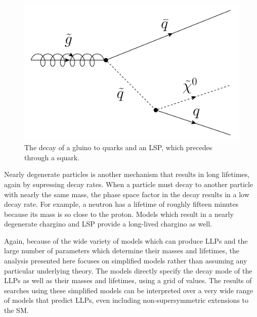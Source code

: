 \begin{figure}
\includegraphics[width=\fullfig]{figures/gluino_decay.png}
\caption{The decay of a gluino to quarks and an \ac{LSP}, which precedes through a squark.}
\label{fig:gluino_decay}
\end{figure}

Nearly degenerate particles is another mechanism that results in long lifetimes, again by supressing decay rates.
When a particle must decay to another particle with nearly the same mass, the phase space factor in the decay results in a low decay rate.
For example, a neutron has a lifetime of roughly fifteen minutes because its mass is so close to the proton.
Models which result in a nearly degenerate chargino and \ac{LSP} provide a long-lived chargino as well.

Again, because of the wide variety of models which can produce \acp{LLP} and the large number of parameters which determine their masses and lifetimes, the analysis presented here focuses on simplified models rather than assuming any particular underlying theory.
The models directly specify the decay mode of the \acp{LLP} as well as their masses and lifetimes, using a grid of values.
The results of searches using these simplified models can be interpreted over a very wide range of models that predict \acp{LLP}, even including non-supersymmetric extensions to the \ac{SM}.
